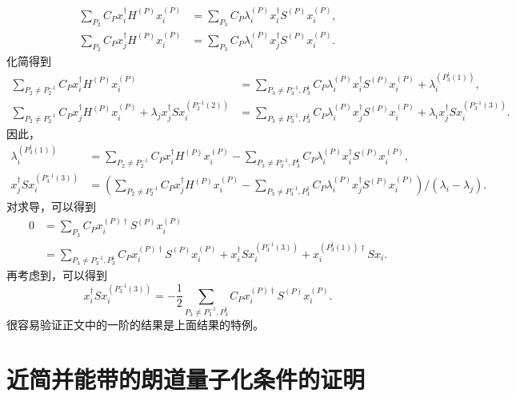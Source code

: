 \begin{appendices}
\begin{align}
\sum_{P_{2}}C_{P}x_{i}^{\dagger}H^{(P)}x_{i}^{(P)} & =\sum_{P_{3}}C_{P}\lambda_{i}^{(P)}x_{i}^{\dagger}S^{(P)}x_{i}^{(P)},\\
\sum_{P_{2}}C_{P}x_{j}^{\dagger}H^{(P)}x_{i}^{(P)} & =\sum_{P_{3}}C_{P}\lambda_{i}^{(P)}x_{j}^{\dagger}S^{(P)}x_{i}^{(P)}.
\end{align}
化简得到
\begin{align}
\sum_{P_{2}\ne P_{2}^{-1}}C_{P}x_{i}^{\dagger}H^{(P)}x_{i}^{(P)} & =\sum_{P_{3}\ne P_{3}^{-1},P_{3}^{1}}C_{P}\lambda_{i}^{(P)}x_{i}^{\dagger}S^{(P)}x_{i}^{(P)}+\lambda_{i}^{(P_{3}^{1}(1))},\\
\sum_{P_{2}\ne P_{2}^{-1}}C_{P}x_{j}^{\dagger}H^{(P)}x_{i}^{(P)}+\lambda_{j}x_{j}^{\dagger}Sx_{i}^{(P_{2}^{-1}(2))} & =\sum_{P_{3}\ne P_{3}^{-1},P_{3}^{1}}C_{P}\lambda_{i}^{(P)}x_{j}^{\dagger}S^{(P)}x_{i}^{(P)}+\lambda_{i}x_{j}^{\dagger}Sx_{i}^{(P_{3}^{-1}(3))}.
\end{align}
因此，
\begin{align}
\lambda_{i}^{(P_{3}^{1}(1))} & =\sum_{P_{2}\ne P_{2}^{-1}}C_{P}x_{i}^{\dagger}H^{(P)}x_{i}^{(P)}-\sum_{P_{3}\ne P_{3}^{-1},P_{3}^{1}}C_{P}\lambda_{i}^{(P)}x_{i}^{\dagger}S^{(P)}x_{i}^{(P)},\\
x_{j}^{\dagger}Sx_{i}^{(P_{3}^{-1}(3))} & =(\sum_{P_{2}\ne P_{2}^{-1}}C_{P}x_{j}^{\dagger}H^{(P)}x_{i}^{(P)}-\sum_{P_{3}\ne P_{3}^{-1},P_{3}^{1}}C_{P}\lambda_{i}^{(P)}x_{j}^{\dagger}S^{(P)}x_{i}^{(P)})/(\lambda_{i}-\lambda_{j}).
\end{align}
对求导，可以得到 
\begin{equation}
\begin{split}
0  &=\sum_{P_{3}}C_{P}x_{i}^{(P)\dagger}S^{(P)}x_{i}^{(P)}\\
    &=\sum_{P_{3}\ne P_{3}^{-1},P_{3}^{1}}C_{P}x_{i}^{(P)\dagger}S^{(P)}x_{i}^{(P)}+x_{i}^{\dagger}Sx_{i}^{(P_{3}^{-1}(3))}+x_{i}^{(P_{3}^{1}(1))\dagger}Sx_{i}.
\end{split}
\end{equation}
再考虑到，可以得到 
\begin{equation}
x_{i}^{\dagger}Sx_{i}^{(P_{3}^{-1}(3))}=-\frac{1}{2}\sum_{P_{3}\ne P_{3}^{-1},P_{3}^{1}}C_{P}x_{i}^{(P)\dagger}S^{(P)}x_{i}^{(P)}.
\end{equation}
很容易验证正文中的一阶的结果是上面结果的特例。

\chapter{近简并能带的朗道量子化条件的证明}\label{app:quantizationruleproof}


\end{appendices}
